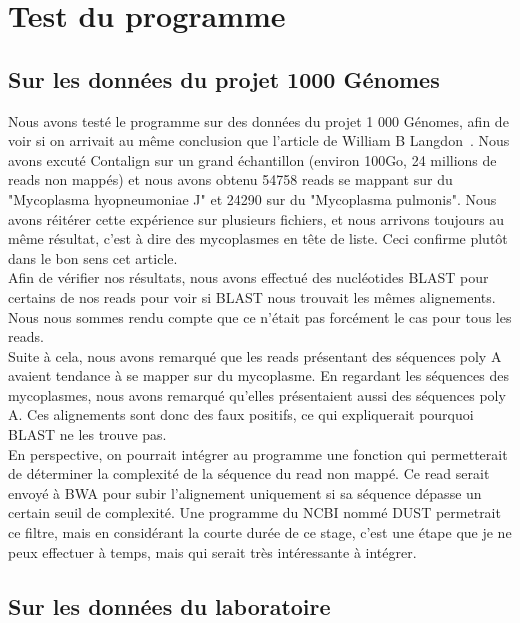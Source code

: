 \documentclass[a4paper,12pt]{article}
\begin{document}
\section{Test du programme}

\subsection{Sur les données du projet 1000 Génomes}

Nous avons testé le programme sur des données du projet 1 000 Génomes, afin de voir si on arrivait au même conclusion que l'article de William B Langdon~\cite{mycoplasme}. Nous avons excuté Contalign sur un grand échantillon (environ 100Go, 24 millions de reads non mappés) et nous avons obtenu 54758 reads se mappant sur du "Mycoplasma hyopneumoniae J" et 24290 sur du "Mycoplasma pulmonis". Nous avons réitérer cette expérience sur plusieurs fichiers, et nous arrivons toujours au même résultat, c'est à dire des mycoplasmes en tête de liste. Ceci confirme plutôt dans le bon sens cet article. \\

Afin de vérifier nos résultats, nous avons effectué des nucléotides BLAST pour certains de nos reads pour voir si BLAST nous trouvait les mêmes alignements. Nous nous sommes rendu compte que ce n'était pas forcément le cas pour tous les reads. \\

Suite à cela, nous avons remarqué que les reads présentant des séquences poly A avaient tendance à se mapper sur du mycoplasme. En regardant les séquences des mycoplasmes, nous avons remarqué qu'elles présentaient aussi des séquences poly A. Ces alignements sont donc des faux positifs, ce qui expliquerait pourquoi BLAST ne les trouve pas. \\

En perspective, on pourrait intégrer au programme une fonction qui permetterait de déterminer la complexité de la séquence du read non mappé. Ce read serait envoyé à BWA pour subir l'alignement uniquement si sa séquence dépasse un certain seuil de complexité. Une programme du NCBI nommé DUST permetrait ce filtre, mais en considérant la courte durée de ce stage, c'est une étape que je ne peux effectuer à temps, mais qui serait très intéressante à intégrer. 

\subsection{Sur les données du laboratoire}
\end{document}
